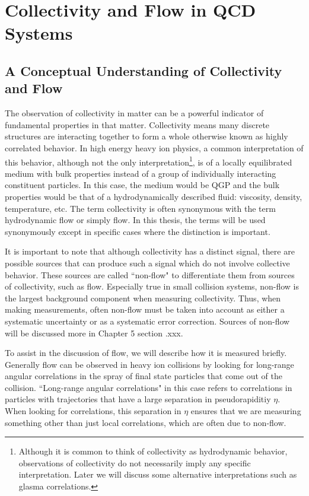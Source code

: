 \chapter{Collectivity and Flow in QCD Systems}
\section{A Conceptual Understanding of Collectivity and Flow}
The observation of collectivity in matter can be a powerful indicator of fundamental properties in that matter. Collectivity means many discrete structures are interacting together to form a whole otherwise known as highly correlated behavior. In high energy heavy ion physics, a common interpretation of this behavior, although not the only interpretation\footnote{Although it is common to think of collectivity as hydrodynamic behavior, observations of collectivity do not necessarily imply any specific interpretation. Later we will discuss some alternative interpretations such as glasma correlations.}, is of a locally equilibrated medium with bulk properties instead of a group of individually interacting constituent particles. In this case, the medium would be QGP and the bulk properties would be that of a hydrodynamically described fluid: viscosity, density, temperature, etc. The term collectivity is often synonymous with the term hydrodynamic flow or simply flow. In this thesis, the terms will be used synonymously except in specific cases where the distinction is important.

It is important to note that although collectivity has a distinct signal, there are possible sources that can produce such a signal which do not involve collective behavior. These sources are called ``non-flow" to differentiate them from sources of collectivity, such as flow. Especially true in small collision systems, non-flow is the largest background component when measuring collectivity. Thus, when making measurements, often non-flow must be taken into account as either a systematic uncertainty or as a systematic error correction. Sources of non-flow will be discussed more in Chapter 5 section .xxx. 

To assist in the discussion of flow, we will describe how it is measured briefly. Generally flow can be observed in heavy ion collisions by looking for long-range angular correlations in the spray of final state particles that come out of the collision. ``Long-range angular correlations" in this case refers to correlations in particles with trajectories that have a large separation in pseudorapiditiy $\eta$. When looking for correlations, this separation in $\eta$ ensures that we are measuring something other than just local correlations, which are often due to non-flow. 

